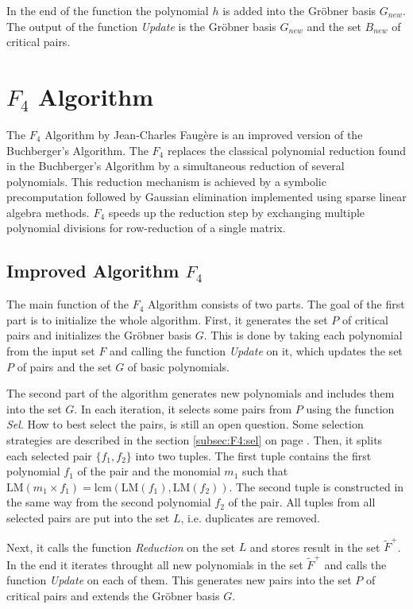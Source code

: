 In the end of the function the polynomial $h$ is added into the Gr\"obner basis $G_{new}$. The output of the function \textit{Update} is the Gr\"obner basis $G_{new}$ and the set $B_{new}$ of critical pairs.



\section{$F_4$ Algorithm}
The $F_4$ Algorithm \cite{F4} by Jean-Charles Faug\`ere is an improved version of the Buchberger's Algorithm. The $F_4$ replaces the classical polynomial reduction found in the Buchberger's Algorithm by a simultaneous reduction of several polynomials. This reduction mechanism is achieved by a symbolic precomputation followed by Gaussian elimination implemented using sparse linear algebra methods. $F_4$ speeds up the reduction step by exchanging multiple polynomial divisions for row-reduction of a single matrix.

\subsection{Improved Algorithm $F_4$}
The main function of the $F_4$ Algorithm consists of two parts. The goal of the first part is to initialize the whole algorithm. First, it generates the set $P$ of critical pairs and initializes the Gr\"obner basis $G$. This is done by taking each polynomial from the input set $F$ and calling the function \textit{Update} on it, which updates the set $P$ of pairs and the set $G$ of basic polynomials.

The second part of the algorithm generates new polynomials and includes them into the set $G$. In each iteration, it selects some pairs from $P$ using the function \textit{Sel}. How to best select the pairs, is still an open question. Some selection strategies are described in the section \ref{subsec:F4:sel} on page \pageref{subsec:F4:sel}. Then, it splits each selected pair $\{f_1, f_2\}$ into two tuples. The first tuple contains the first polynomial $f_1$ of the pair and the monomial $m_1$ such that $\textrm{LM}(m_1 \times f_1) = \textrm{lcm}(\textrm{LM}(f_1),\textrm{LM}(f_2))$. The second tuple is constructed in the same way from the second polynomial $f_2$ of the pair. All tuples from all selected pairs are put into the set $L$, i.e. duplicates are removed.

Next, it calls the function \textit{Reduction} on the set $L$ and stores result in the set $\tilde{F}^+$. In the end it iterates throught all new polynomials in the set $\tilde{F}^+$ and calls the function \textit{Update} on each of them. This generates new pairs into the set $P$ of critical pairs and extends the Gr\"obner basis $G$.

